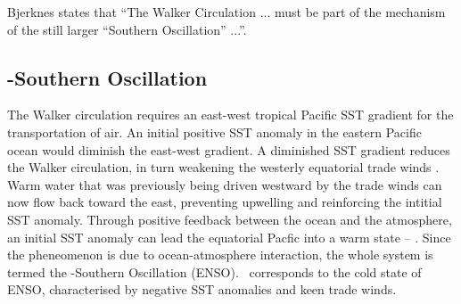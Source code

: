 Bjerknes states that ``The Walker Circulation ... must be part of the mechanism
of the still larger ``Southern Oscillation'' ...''.





\subsection{\elnino-Southern Oscillation}
The Walker circulation requires an east-west tropical Pacific SST gradient for
the transportation of air. An initial positive SST anomaly in the eastern
Pacific ocean would diminish the east-west gradient. A diminished SST gradient
reduces the Walker circulation, in turn weakening the westerly equatorial trade
winds \citep{lindzen1987}. Warm water that was previously being driven westward
by the trade winds can now flow back toward the east, preventing upwelling and
reinforcing the intitial SST anomaly. Through positive feedback between the
ocean and the atmosphere, an initial SST anomaly can lead the equatorial Pacfic
into a warm state -- \elnino. Since the pheneomenon is due to ocean-atmosphere
interaction, the whole system is termed the \elnino-Southern Oscillation
(ENSO). {}\nina\ corresponds to the cold state of ENSO, characterised by
negative SST anomalies and keen trade winds.


